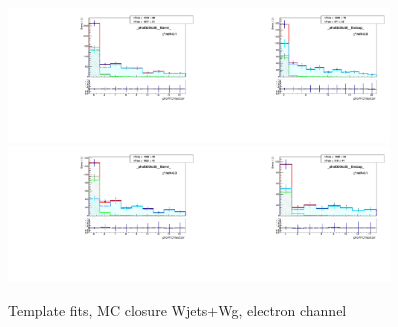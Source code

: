 \begin{figure}[htb]
\begin{center}
   \includegraphics[width=0.45\textwidth]{../figs/figs_v11/ELECTRON_WGamma/MCclosureWjetsPlusWg/c_TEMPL_CHISO_UNblind__phoEt25to30__Barrel__RooFit_MCclosure.pdf}\includegraphics[width=0.45\textwidth]{../figs/figs_v11/ELECTRON_WGamma/MCclosureWjetsPlusWg/c_TEMPL_CHISO_UNblind__phoEt25to30__Endcap__RooFit_MCclosure.pdf}\\
   \includegraphics[width=0.45\textwidth]{../figs/figs_v11/ELECTRON_WGamma/MCclosureWjetsPlusWg/c_TEMPL_CHISO_UNblind__phoEt30to35__Barrel__RooFit_MCclosure.pdf}\includegraphics[width=0.45\textwidth]{../figs/figs_v11/ELECTRON_WGamma/MCclosureWjetsPlusWg/c_TEMPL_CHISO_UNblind__phoEt30to35__Endcap__RooFit_MCclosure.pdf}\\
  \label{fig:templateFits_MCclosureWjetsPlusWg_CHISO_ELECTRON_1}
  \caption{Template fits, MC closure Wjets+Wg, electron channel}
  \end{center}
\end{figure}

